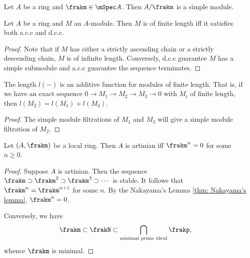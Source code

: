     \begin{example}\label{eg: A/m is a simple module}
        Let $A$ be a ring and $\frakm \in \mSpec A$.
        Then $A/\frakm$ is a simple module.
    \end{example}

    \begin{proposition}\label{prop: of finite length iff both acc and dcc}
        Let $A$ be a ring and $M$ an $A$-module.
        Then $M$ is of finite length iff it satisfies both a.c.c and d.c.c.
    \end{proposition}
    \begin{proof}
        Note that if $M$ has either a strictly ascending chain or a strictly descending chain, $M$ is of infinite length.
        Conversely, d.c.c guarantee $M$ has a simple submodule and a.c.c guarantee the sequence terminates.
    \end{proof}

    \begin{proposition}\label{prop: length is additive for modules of finite length}
        The length $l(-)$ is an additive function for modules of finite length.
        That is, if we have an exact sequence $0 \to M_1 \to M_2 \to M_3 \to 0$ with $M_i$ of finite length, then $l(M_2) = l(M_1) + l(M_3)$.
    \end{proposition}
    \begin{proof}
        The simple module filtrations of $M_1$ and $M_3$ will give a simple module filtration of $M_2$.
    \end{proof}

    \begin{proposition}\label{prop: characteristic of local artinian rings}
        Let $(A,\frakm)$ be a local ring.
        Then $A$ is artinian iff $\frakm^n = 0$ for some $n\geq 0$.    
    \end{proposition}
    \begin{proof}
        Suppose $A$ is artinian.
        Then the sequence $\frakm \supset \frakm^2 \supset \frakm^3 \supset \cdots$ is stable.
        It follows that $\frakm^n = \frakm^{n+1}$ for some $n$.
        By the Nakayama's Lemma \ref{thm: Nakayama's lemma}, $\frakm^n = 0$.

        Conversely, we have 
        \[ \frakm \subset \frakN \subset \bigcap_{\text{minimal prime ideal}} \frakp,\] 
        whence $\frakm$ is minimal.
    \end{proof}

